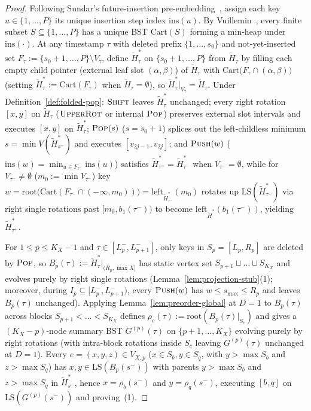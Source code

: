 \documentclass[11pt]{article}
\theoremstyle{definition}
\theoremstyle{remark}
\newcommand{\LS}{\mathrm{LS}}
\newcommand{\PUSH}{\textnormal{\scshape Push}}
\newcommand{\POP}{\textnormal{\scshape Pop}}
\newcommand{\SHIFT}{\textnormal{\scshape Shift}}
\newcommand{\UPROT}{\textnormal{\scshape UpperRot}}
\begin{document}
\begin{proof}
Following Sundar's future-insertion pre-embedding~\cite[Section~3, Lemma~10, Simplification~2]{Sundar1992}, assign each key $u \in \{1, \dots, P\}$ its unique insertion step index $\mathrm{ins}(u)$. By Vuillemin~\cite{Vuillemin1980}, every finite subset $S \subseteq \{1, \dots, P\}$ has a unique BST $\mathrm{Cart}(S)$ forming a min-heap under $\mathrm{ins}(\cdot)$. At any timestamp $\tau$ with deleted prefix $\{1, \dots, s_0\}$ and not-yet-inserted set $F_\tau := \{s_0 + 1, \dots, P\} \setminus V_\tau$, define $\widetilde{H}^*_\tau$ on $\{s_0 + 1, \dots, P\}$ from $\widetilde{H}_\tau$ by filling each empty child pointer (external leaf slot $(\alpha, \beta)$) of $\widetilde{H}_\tau$ with $\mathrm{Cart}\big(F_\tau \cap (\alpha, \beta)\big)$ (setting $\widetilde{H}^*_\tau := \mathrm{Cart}(F_\tau)$ when $\widetilde{H}_\tau = \emptyset$), so $\widetilde{H}^*_\tau|_{V_\tau} = \widetilde{H}_\tau$. Under Definition~\ref{def:folded-pop}: $\SHIFT$ leaves $\widetilde{H}^*_\tau$ unchanged; every right rotation $[x, y]$ on $\widetilde{H}_\tau$ ($\UPROT$ or internal $\POP$) preserves external slot intervals and executes $[x, y]$ on $\widetilde{H}^*_\tau$; $\POP(s)$ ($s = s_0 + 1$) splices out the left-childless minimum $s = \min V(\widetilde{H}^*_{s^-})$ and executes $[v_{2j-1}, v_{2j}]$; and $\PUSH(w)$ ($\mathrm{ins}(w) = \min_{u \in F_{\tau^-}} \mathrm{ins}(u)$) satisfies $\widetilde{H}^*_{\tau^+} = \widetilde{H}^*_{\tau^-}$ when $V_{\tau^-} = \emptyset$, while for $V_{\tau^-} \ne \emptyset$ ($m_0 := \min V_{\tau^-}$) key $w = \mathrm{root}\big(\mathrm{Cart}(F_{\tau^-} \cap (-\infty, m_0))\big) = \mathrm{left}_{\widetilde{H}^*_{\tau^-}}(m_0)$ rotates up $\LS(\widetilde{H}^*_{\tau^-})$ via right single rotations past $[m_0, b_1(\tau^-))$ to become $\mathrm{left}_{\widetilde{H}^*}(b_1(\tau^-))$, yielding $\widetilde{H}^*_{\tau^+}$.

For $1 \le p \le K_X - 1$ and $\tau \in [L_p^-, L_{p+1}^-]$, only keys in $S_p = [L_p, R_p]$ are deleted by $\POP$, so $B_p(\tau) := \widetilde{H}^*_\tau|_{(R_p, \max X]}$ has static vertex set $S_{p+1} \sqcup \dots \sqcup S_{K_X}$ and evolves purely by right single rotations (Lemma~\ref{lem:projection-stub}(1); moreover, during $I_p \subseteq [L_p^-, L_{p+1}^-)$, every $\PUSH(w)$ has $w \le s_{\max} \le R_p$ and leaves $B_p(\tau)$ unchanged). Applying Lemma~\ref{lem:preorder-global} at $D = 1$ to $B_p(\tau)$ across blocks $S_{p+1} < \dots < S_{K_X}$ defines $\rho_c(\tau) := \mathrm{root}(B_p(\tau)|_{S_c})$ and gives a $(K_X - p)$-node summary BST $G^{(p)}(\tau)$ on $\{p + 1, \dots, K_X\}$ evolving purely by right rotations (with intra-block rotations inside $S_c$ leaving $G^{(p)}(\tau)$ unchanged at $D = 1$). Every $e = (x, y, z) \in V_{X, p}$ ($x \in S_b, y \in S_q$, with $y > \max S_b$ and $z > \max S_q$) has $x, y \in \LS(B_p(s^-))$ with parents $y > \max S_b$ and $z > \max S_q$ in $\widetilde{H}^*_{s^-}$, hence $x = \rho_b(s^-)$ and $y = \rho_q(s^-)$, executing $[b, q]$ on $\LS(G^{(p)}(s^-))$ and proving~(1).


\end{proof}
\end{document}
